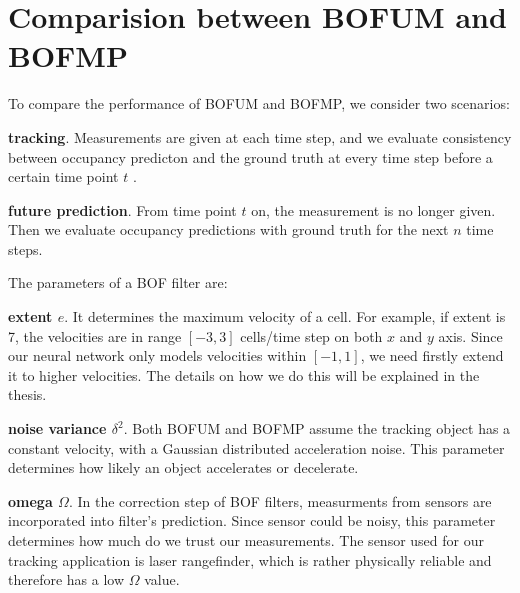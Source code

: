 \section{Comparision between BOFUM and BOFMP}

To compare the performance of BOFUM and BOFMP, we consider two scenarios:

\begin{my_enumerate}
\item \textbf{tracking}. Measurements are given at each time step, and we evaluate consistency between occupancy predicton and the ground truth at every time step before a certain time point \( t \) .
\item \textbf{future prediction}. From time point \( t \) on, the measurement is no longer given. Then we evaluate occupancy predictions with ground truth for the next \( n \) time steps.
\end{my_enumerate}

The parameters of a BOF filter are:
\begin{my_enumerate}
\item \textbf{extent \( e\)}. It determines the maximum velocity of a cell. For example, if extent is 7, the velocities are in range  \( [-3, 3] \) cells/time step on both \( x \) and \( y \) axis. Since our neural network only models velocities within \( [-1, 1]\), we need firstly extend it to higher velocities. The details on how we do this will be explained in the thesis. 
\item \textbf{noise variance \( \delta^2\)}. Both BOFUM and BOFMP assume the tracking object has a constant velocity, with a Gaussian distributed acceleration noise. This parameter determines how likely an object accelerates or decelerate.
\item \textbf{omega \( \Omega \)}. In the correction step of BOF filters, measurments from sensors are incorporated into filter's prediction. Since sensor could be noisy, this parameter determines how much do we trust our measurements. The sensor used for our tracking application is laser rangefinder, which is rather physically reliable and therefore has a low \( \Omega \) value.
\end{my_enumerate}

